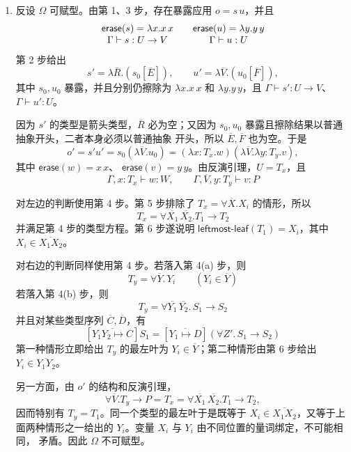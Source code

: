 \begin{taplauthorsolutionentrybox}
\begin{enumerate}
  \item 反设 \(\Omega\) 可赋型。由第 1、3 步，存在暴露应用
        \(o=s\,u\)，并且
        \[
        \begin{array}{c@{\qquad}c}
        \mathsf{erase}(s)=\lambda x.x\,x&
        \mathsf{erase}(u)=\lambda y.y\,y\\
        \Gamma\vdash s:U\to V&\Gamma\vdash u:U
        \end{array}
        \]
        第 2 步给出
        \[
        s'=\lambda\overline R.(s_0[\overline E]),
        \qquad
        u'=\lambda\overline V.(u_0[\overline F]),
        \]
        其中 \(s_0,u_0\) 暴露，并且分别仍擦除为
        \(\lambda x.x\,x\) 和 \(\lambda y.y\,y\)，且
        \(\Gamma\vdash s':U\to V\)、\(\Gamma\vdash u':U\)。

        因为 \(s'\) 的类型是箭头类型，\(\overline R\) 必为空；又因为
        \(s_0,u_0\) 暴露且擦除结果以普通抽象开头，二者本身必须以普通抽象
        开头，所以 \(\overline E,\overline F\) 也为空。于是
        \[
        o'=s'u'=s_0(\lambda\overline V.u_0)
        =(\lambda x:T_x.w)(\lambda\overline V.\lambda y:T_y.v),
        \]
        其中 \(\mathsf{erase}(w)=x\,x\)、
        \(\mathsf{erase}(v)=y\,y\)。由反演引理，\(U=T_x\)，且
        \[
        \Gamma,x:T_x\vdash w:W,
        \qquad
        \Gamma,\overline V,y:T_y\vdash v:P
        \]

        对左边的判断使用第 4 步。第 5 步排除了
        \(T_x=\forall\overline X.X_i\) 的情形，所以
        \[
        T_x=\forall\overline{X_1}\,\overline{X_2}.T_1\to T_2
        \]
        并满足第 4 步的类型方程。第 6 步遂说明
        \(\mathsf{leftmost\mbox{-}leaf}(T_1)=X_i\)，其中
        \(X_i\in\overline{X_1X_2}\)。

        对右边的判断同样使用第 4 步。若落入第 4(a) 步，则
        \[
        T_y=\forall\overline Y.\,Y_i
        \qquad(Y_i\in\overline Y)
        \]
        若落入第 4(b) 步，则
        \[
        T_y=\forall\overline{Y_1}\,\overline{Y_2}.\,S_1\to S_2
        \]
        并且对某些类型序列 \(\overline C,\overline D\)，有
        \[
        [\overline{Y_1Y_2\mapsto C}]S_1
        = [\overline{Y_1\mapsto D}]
          (\forall Z'.\,S_1\to S_2)
        \]
        第一种情形立即给出 \(T_y\) 的最左叶为
        \(Y_i\in\overline Y\)；第二种情形由第 6 步给出
        \(Y_i\in\overline{Y_1Y_2}\)。

        另一方面，由 \(o'\) 的结构和反演引理，
        \[
        \forall\overline V.T_y\to P
        =T_x
        =\forall\overline{X_1}\,\overline{X_2}.T_1\to T_2,
        \]
        因而特别有 \(T_y=T_1\)。同一个类型的最左叶于是既等于
        \(X_i\in\overline{X_1X_2}\)，又等于上面两种情形之一给出的
        \(Y_i\)。变量 \(X_i\) 与 \(Y_i\) 由不同位置的量词绑定，不可能相同，
        矛盾。因此 \(\Omega\) 不可赋型。
\end{enumerate}
\end{taplauthorsolutionentrybox}

